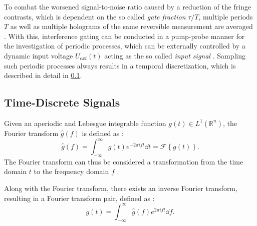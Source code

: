 To combat the worsened signal-to-noise ratio caused by a reduction of the fringe contrasts, which is dependent on the so called \emph{gate fraction} $\tau / T$, multiple periods $T$ as well as multiple holograms of the same reversible measurement are averaged \cite{Niermann2017,Wagner2019}. With this, interference gating can be conducted in a pump-probe manner \cite{Mueller2014,Bothschafter2009} for the investigation of periodic processes, which can be externally controlled by a dynamic input voltage $U_{ext}\left(t\right)$ acting as the so called \emph{input signal} \cite{Niermann2017,Wagner2019}. Sampling such periodic processes always results in a temporal discretization, which is described in detail in \cref{ssec:discrete-signals}.
\newpage
\subsection{Time-Discrete Signals} \label{ssec:discrete-signals}
Given an aperiodic and Lebesgue integrable function $g\left(t\right) \in L^1\left(\mathbb{R}^n\right)$, the Fourier transform $\hat{g}\left(f\right)$ is defined as \cite{rahman2011,kaiser2011}:
\begin{equation}
	\hat{g}\left(f\right) = \int_{-\infty}^{\infty} g\left(t\right) e^{-2\pi i f t} \dd{t} = \mathcal{F}\left\{g\left(t\right)\right\}.
\end{equation}
The Fourier transform can thus be considered a transformation from the time domain $t$ to the frequency domain $f$ \cite{rahman2011,kaiser2011}.

Along with the Fourier transform, there exists an inverse Fourier transform, resulting in a Fourier transform pair, defined as \cite{rahman2011,kaiser2011}:
\begin{equation}
	g\left(t\right) = \int_{-\infty}^{\infty} \hat{g}\left(f\right) e^{2\pi i f t} \dd{f}.
\end{equation}

